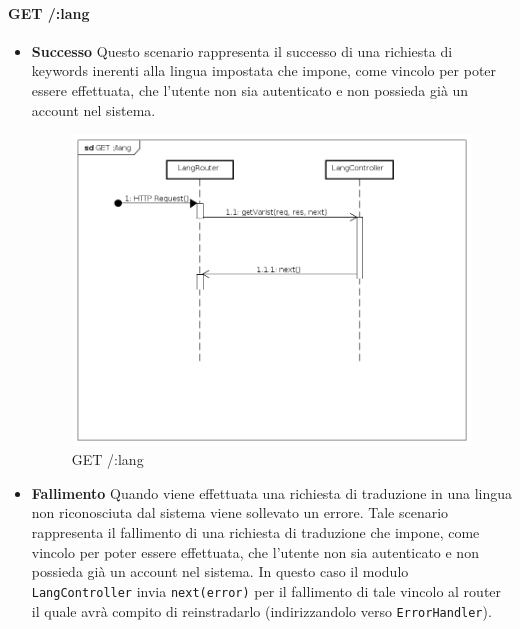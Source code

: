 \paragraph{GET /:lang}
\begin{itemize}
\item \textbf{Successo}
Questo scenario rappresenta il successo di una richiesta di keywords inerenti alla lingua impostata che impone, come vincolo per poter essere effettuata, che l'utente non sia autenticato e non possieda già un account nel sistema.  
\label{Procedura di traduzione}
\begin{figure}[ht]
	\centering
	\includegraphics[scale=0.40]{UML/DiagrammiDiSequenza/Back-end/GET_lang_success.png}
	\caption{GET /:lang}
\end{figure}
\FloatBarrier

\item \textbf{Fallimento}
Quando viene effettuata una richiesta di traduzione in una lingua non riconosciuta dal sistema viene sollevato un errore. Tale scenario rappresenta il fallimento di una richiesta di traduzione che impone, come vincolo per poter essere effettuata, che l'utente non sia autenticato e non possieda già un account nel sistema. In questo caso il modulo \texttt{LangController} invia \texttt{next(error)} per il fallimento di tale vincolo al router il quale avrà compito di reinstradarlo (indirizzandolo verso \texttt{ErrorHandler}).
 

\end{itemize}
